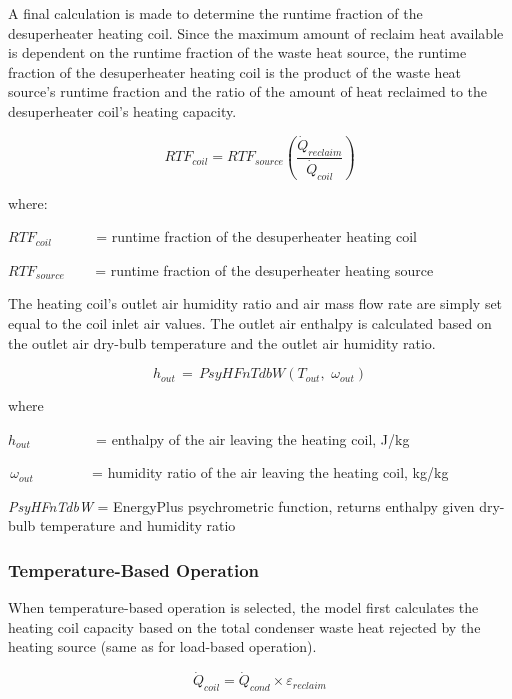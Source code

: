 A final calculation is made to determine the runtime fraction of the desuperheater heating coil. Since the maximum amount of reclaim heat available is dependent on the runtime fraction of the waste heat source, the runtime fraction of the desuperheater heating coil is the product of the waste heat source's runtime fraction and the ratio of the amount of heat reclaimed to the desuperheater coil's heating capacity.

\begin{equation}
RT{F_{coil}} = RT{F_{source}}\left( {\frac{{{{\dot Q}_{reclaim}}}}{{{{\dot Q}_{coil}}}}} \right)
\end{equation}

where:

\(RT{F_{coil}}\) ~~~~~ = runtime fraction of the desuperheater heating coil

\(RT{F_{source}}\) ~~~ = runtime fraction of the desuperheater heating source

The heating coil's outlet air humidity ratio and air mass flow rate are simply set equal to the coil inlet air values. The outlet air enthalpy is calculated based on the outlet air dry-bulb temperature and the outlet air humidity ratio.

\begin{equation}
{h_{out}}\, = \,PsyHFnTdbW({T_{out}},\,\,{\omega_{out}})
\end{equation}

where

\({h_{out}}\) ~~~~~~~~ = enthalpy of the air leaving the heating coil, J/kg

\(\,{\omega_{out}}\) ~~~~~~~ = humidity ratio of the air leaving the heating coil, kg/kg

\emph{PsyHFnTdbW} = EnergyPlus psychrometric function, returns enthalpy given dry-bulb temperature and humidity ratio

\subsubsection{Temperature-Based Operation}\label{temperature-based-operation}

When temperature-based operation is selected, the model first calculates the heating coil capacity based on the total condenser waste heat rejected by the heating source (same as for load-based operation).

\begin{equation}
{\dot Q_{coil}} = {\dot Q_{cond}} \times {\varepsilon_{reclaim}}
\end{equation}

